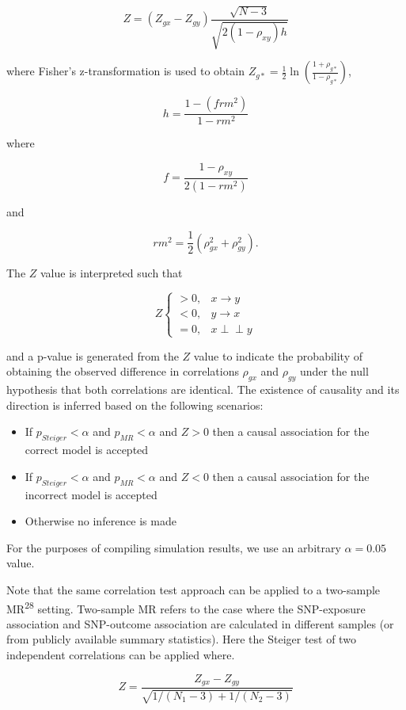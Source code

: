\documentclass[]{article}
\providecommand{\tightlist}{%
  \setlength{\itemsep}{0pt}\setlength{\parskip}{0pt}}
\begin{document}
\[
Z = (Z_{gx} - Z_{gy}) \frac{\sqrt{N-3}}{\sqrt{2(1-\rho_{xy})h}}
\]

where Fisher's z-transformation is used to obtain
\(Z_{g*} = \frac{1}{2} \ln \left ( \frac{1+\rho_{g*}}{1-\rho_{g*}} \right )\),

\[
h = \frac{1 - (frm^2)} {1 - rm^2}
\]

where

\[
f = \frac{1 - \rho_{xy}}{2(1 - rm^2)}
\]

and

\[
rm^2 = \frac{1}{2}(\rho_{gx}^2 + \rho_{gy}^2).
\]

The \(Z\) value is interpreted such that

\[
Z \left\{
\begin{array}{ll}
> 0, & x \to y\\
< 0, & y \to x\\
= 0, & x \perp\!\!\!\perp y 
\end{array} \right.
\]

and a p-value is generated from the \(Z\) value to indicate the
probability of obtaining the observed difference in correlations
\(\rho_{gx}\) and \(\rho_{gy}\) under the null hypothesis that both
correlations are identical. The existence of causality and its direction
is inferred based on the following scenarios:

\begin{itemize}
\tightlist
\item
  If \(p_{Steiger} < \alpha\) and \(p_{MR} < \alpha\) and \(Z > 0\) then
  a causal association for the correct model is accepted
\item
  If \(p_{Steiger} < \alpha\) and \(p_{MR} < \alpha\) and \(Z < 0\) then
  a causal association for the incorrect model is accepted
\item
  Otherwise no inference is made
\end{itemize}

For the purposes of compiling simulation results, we use an arbitrary
\(\alpha = 0.05\) value.

Note that the same correlation test approach can be applied to a
two-sample MR\textsuperscript{28} setting. Two-sample MR refers to the
case where the SNP-exposure association and SNP-outcome association are
calculated in different samples (or from publicly available summary
statistics). Here the Steiger test of two independent correlations can
be applied where.

\[
Z = \frac{Z_{gx} - Z_{gy}} { \sqrt{ 1 / (N_{1} - 3) + 1 / (N_{2} - 3) } }
\]
\end{document}
